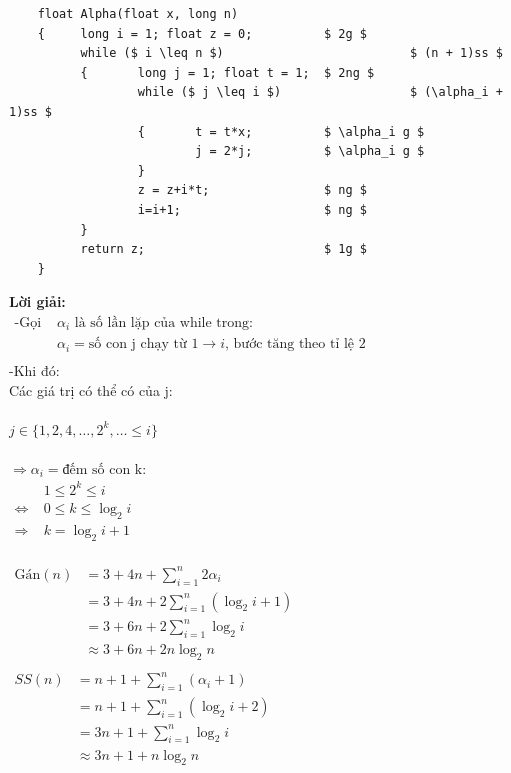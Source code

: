 \documentclass[12pt, letterpaper]{article}
\begin{document}
\begin{lstlisting}
    float Alpha(float x, long n)
    {     long i = 1; float z = 0;          $ 2g $
          while ($ i \leq n $)                          $ (n + 1)ss $
          {       long j = 1; float t = 1;  $ 2ng $
                  while ($ j \leq i $)                  $ (\alpha_i + 1)ss $
                  {       t = t*x;          $ \alpha_i g $
                          j = 2*j;          $ \alpha_i g $
                  }
                  z = z+i*t;                $ ng $
                  i=i+1;                    $ ng $
          }
          return z;                         $ 1g $
    }
\end{lstlisting}
\textbf{Lời giải: } \\
$ \begin{aligned}
		\text{-Gọi } & \alpha_i \text{ là số lần lặp của while trong:}                              \\
		            & \alpha_i = \text{số con j chạy từ 1} \rightarrow i \text{, bước tăng theo tỉ lệ 2} \\
	\end{aligned} $ \\
	-Khi đó:\\
	Các giá trị có thể có của j: \\ \\
	$ j \in \{ 1, 2, 4, \ldots, 2^k, \ldots \leq i \} $ \\ \\
	$ \Rightarrow \alpha_i = \text{đếm số con k:} $ \\ 
$ \begin{aligned}
    & 1 \leq 2^k \leq i \\
    \Leftrightarrow\; & 0 \leq k \leq \log_2{i} \\
    \Rightarrow\; & k = \log_2{i} + 1
\end{aligned} $ \\
 \\
$ \begin{aligned}
    \text{Gán}(n) & = 3 + 4n + \sum^{n}_{i = 1} 2 \alpha_i \\
                  & = 3 + 4n + 2 \sum^{n}_{i = 1} (\log_2{i} + 1) \\
                  & = 3 + 6n + 2 \sum^{n}_{i = 1} \log_2{i} \\
                  & \approx 3 + 6n + 2 n \log_2{n} \\
\end{aligned} $ \\
$ \begin{aligned}
	SS(n) & = n + 1 + \sum^{n}_{i = 1} (\alpha_i + 1)           \\
          & = n + 1 + \sum^{n}_{i = 1} (\log_2{i} + 2)           \\
          & = 3n + 1 + \sum^{n}_{i = 1} \log_2{i}           \\
          & \approx 3n + 1 + n \log_2{n}           \\
\end{aligned} $ \\
\end{document}
